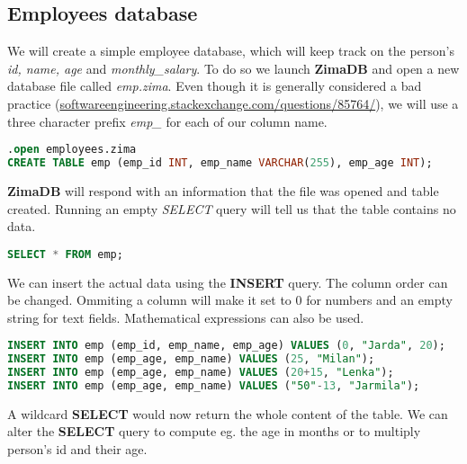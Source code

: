 \documentclass[a4paper]{article}
\begin{document}
\subsection{Employees database}
We will create a simple employee database, which will keep track on the person's \textit{id, name, age} and \textit{monthly\_salary}. To do so we launch \textbf{ZimaDB} and open a new database file called \textit{emp.zima}. Even though it is generally considered a bad practice (\href{https://softwareengineering.stackexchange.com/questions/85764/why-is-prefixing-column-names-considered-bad-practice}{softwareengineering.stackexchange.com/questions/85764/}), we will use a three character prefix \textit{emp\_} for each of our column name.

\vspace{0.5cm}
\begin{lstlisting}[language=SQL]
.open employees.zima
CREATE TABLE emp (emp_id INT, emp_name VARCHAR(255), emp_age INT);
\end{lstlisting}
\vspace{0.5cm}

\textbf{ZimaDB} will respond with an information that the file was opened and table created. Running an empty \textit{SELECT} query will tell us that the table contains no data.


\vspace{0.5cm}
\begin{lstlisting}[language=SQL]
SELECT * FROM emp;
\end{lstlisting}
\vspace{0.5cm}

We can insert the actual data using the \textbf{INSERT} query. The column order can be changed. Ommiting a column will make it set to 0 for numbers and an empty string for text fields. Mathematical expressions can also be used.

\vspace{0.5cm}
\begin{lstlisting}[language=SQL, backgroundcolor=\color{lbcolor}]
INSERT INTO emp (emp_id, emp_name, emp_age) VALUES (0, "Jarda", 20);
INSERT INTO emp (emp_age, emp_name) VALUES (25, "Milan");
INSERT INTO emp (emp_age, emp_name) VALUES (20+15, "Lenka");
INSERT INTO emp (emp_age, emp_name) VALUES ("50"-13, "Jarmila");
\end{lstlisting}
\vspace{0.5cm}

A wildcard \textbf{SELECT} would now return the whole content of the table. We can alter the \textbf{SELECT} query to compute eg. the age in months or to multiply person's id and their age. 
\end{document}
